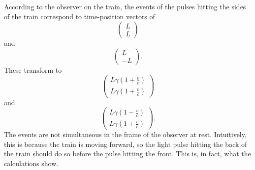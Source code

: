 \documentclass[12pt]{scrartcl}
\begin{document}
According to the observer on the train, the events of the pulses hitting the sides of the train correspond to time-position vectors of
\[\begin{pmatrix}
		L \\ L
	\end{pmatrix} \] and \[\begin{pmatrix}
		L \\ -L
	\end{pmatrix}. \] These transform to
\[\begin{pmatrix}
		L\gamma\left(1+\frac{v}{c}\right) \\ L\gamma\left(1+\frac{v}{c}\right)
	\end{pmatrix} \] and \[\begin{pmatrix}
		L\gamma\left(1-\frac{v}{c}\right) \\ L\gamma\left(1+\frac{v}{c}\right)
	\end{pmatrix}. \]
The events are not simultaneous in the frame of the observer at rest. Intuitively, this is because the train is moving forward, so the light pulse hitting the back of the train should do so before the pulse hitting the front. This is, in fact, what the calculations show.
\end{document}

